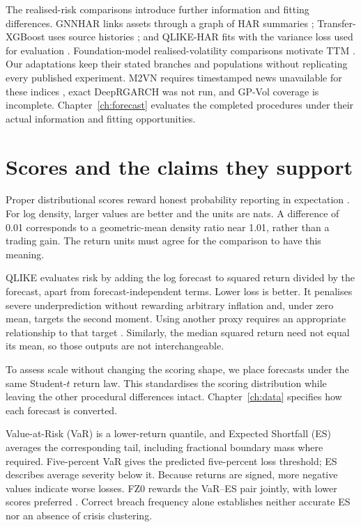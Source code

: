 The realised-risk comparisons introduce further information and fitting differences. GNNHAR links assets through a graph of HAR summaries \citep{zhang2025gnnhar}; Transfer-XGBoost uses source histories \citep{teller2026transfer}; and QLIKE-HAR fits with the variance loss used for evaluation \citep{puke2026coherent}. Foundation-model realised-volatility comparisons motivate TTM \citep{brini2026foundation}. Our adaptations keep their stated branches and populations without replicating every published experiment. M2VN requires timestamped news unavailable for these indices \citep{kong2025m2vn}, exact DeepRGARCH was not run, and GP-Vol coverage is incomplete. Chapter~\ref{ch:forecast} evaluates the completed procedures under their actual information and fitting opportunities.

\section{Scores and the claims they support}
\label{sec:bg-scoring}

Proper distributional scores reward honest probability reporting in expectation \citep{gneiting2007strictly}. For log density, larger values are better and the units are nats. A difference of 0.01 corresponds to a geometric-mean density ratio near 1.01, rather than a trading gain. The return units must agree for the comparison to have this meaning.

QLIKE evaluates risk by adding the log forecast to squared return divided by the forecast, apart from forecast-independent terms. Lower loss is better. It penalises severe underprediction without rewarding arbitrary inflation and, under zero mean, targets the second moment. Using another proxy requires an appropriate relationship to that target \citep{patton2011volatility}. Similarly, the median squared return need not equal its mean, so those outputs are not interchangeable.

To assess scale without changing the scoring shape, we place forecasts under the same Student-$t$ return law. This standardises the scoring distribution while leaving the other procedural differences intact. Chapter~\ref{ch:data} specifies how each forecast is converted.

Value-at-Risk (VaR) is a lower-return quantile, and Expected Shortfall (ES) averages the corresponding tail, including fractional boundary mass where required. Five-percent VaR gives the predicted five-percent loss threshold; ES describes average severity below it. Because returns are signed, more negative values indicate worse losses. FZ0 rewards the VaR--ES pair jointly, with lower scores preferred \citep{fissler2016higher,fissler2021correction,patton2019dynamic}. Correct breach frequency alone establishes neither accurate ES nor an absence of crisis clustering.


